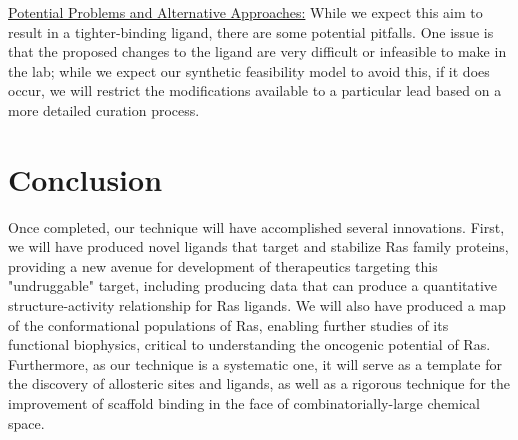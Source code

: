 \documentclass[12pt]{article}
\begin{document}
\underline{Potential Problems and Alternative Approaches:} While we expect this aim to result in a tighter-binding ligand, there are some potential pitfalls. One issue is that the proposed changes to the ligand are very difficult or infeasible to make in the lab; while we expect our synthetic feasibility model to avoid this, if it does occur, we will restrict the modifications available to a particular lead based on a more detailed curation process.


\section*{Conclusion}
Once completed, our technique will have accomplished several innovations. First, we will have produced novel ligands that target and stabilize Ras family proteins, providing a new avenue for development of therapeutics targeting this "undruggable" target, including producing data that can produce a quantitative structure-activity relationship for Ras ligands. We will also have produced a map of the conformational populations of Ras, enabling further studies of its functional biophysics, critical to understanding the oncogenic potential of Ras. Furthermore, as our technique is a systematic one, it will serve as a template for the discovery of allosteric sites and ligands, as well as a rigorous technique for the improvement of scaffold binding in the face of combinatorially-large chemical space.

\clearpage

  
  
\end{document}
